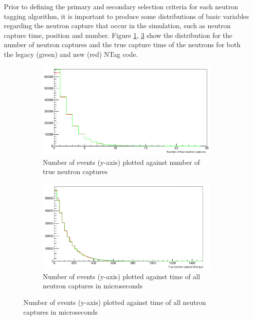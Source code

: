 Prior to defining the primary and secondary selection criteria for each neutron tagging algorithm, it is important to produce some distributions of basic variables regarding the neutron capture that occur in the simulation, such as neutron capture time, position and number. Figure \ref{fig:NTrueCaptures}, \ref{fig:TrueCaptureTime} show the distribution for the number of neutron captures and the true capture time of the neutrons for both the legacy (green) and new (red) NTag code.  

\begin{figure}
    \centering
     \begin{subfigure}[b]{0.49\linewidth}
      \includegraphics[width=\linewidth]{Figures/NTrueCaptures.PNG}
      \caption{Number of events (y-axis) plotted against number of true neutron captures}
      \label{fig:NTrueCaptures} 
     \end{subfigure}
     \begin{subfigure}[b]{0.49\linewidth}
       \includegraphics[width=\linewidth]{Figures/TrueCaptureTime.PNG}
        \caption{Number of events (y-axis) plotted against time of all neutron captures in microseconds} 
     \label{fig:TrueCaptureTime}
      \end{subfigure} 
\end{figure}

